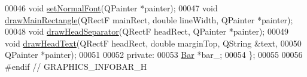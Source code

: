 \begin{DoxyCode}
00046   \textcolor{keywordtype}{void} \hyperlink{class_info_bar_a2bfda27ec3d1ae6b4b1c927876f594c1}{setNormalFont}(QPainter *painter);
00047   \textcolor{keywordtype}{void} \hyperlink{class_info_bar_a5d5440d1ca77a5366e51ac9e6f6aa4d3}{drawMainRectangle}(QRectF mainRect, \textcolor{keywordtype}{double} lineWidth, QPainter *painter);
00048   \textcolor{keywordtype}{void} \hyperlink{class_info_bar_a9b89dc7229ecee097d9ca9c4e6fa38f2}{drawHeadSeparator}(QRectF headRect, QPainter *painter);
00049   \textcolor{keywordtype}{void} \hyperlink{class_info_bar_a912f4b2babec3df1aad3d31bc54a6e34}{drawHeadText}(QRectF headRect, \textcolor{keywordtype}{double} marginTop, QString &text,
00050                     QPainter *painter);
00051 
00052 private:
00053   \hyperlink{class_bar}{Bar} *bar\_;
00054 \};
00055 
00056 \textcolor{preprocessor}{#endif  // GRAPHICS\_INFOBAR\_H}
\end{DoxyCode}
